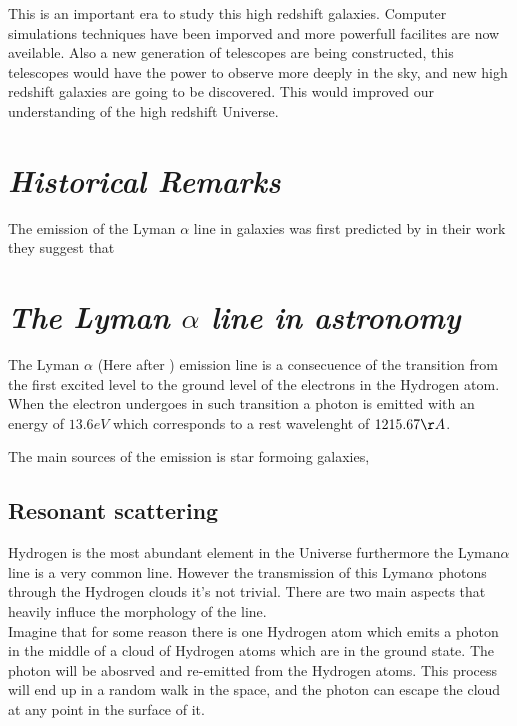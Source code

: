 This is an important era to study this high redshift galaxies. Computer 
simulations techniques have been imporved and more powerfull facilites are
now aveilable. Also a new generation of telescopes are being constructed,
this telescopes would have the power to observe more deeply in the sky, 
and new high redshift galaxies are going to be discovered. This would 
improved our understanding of the high redshift Universe. 

\section{\emph{Historical Remarks}}

The emission of the Lyman $\alpha$ line in galaxies was first predicted by \citep{PartridgePeebles} in their work they suggest that 




\section{\emph{The Lyman $\alpha$ line in astronomy}}

The Lyman $\alpha$ (Here after \ly) emission line is a consecuence of the transition 
from the first excited level to the ground level of the electrons
in the Hydrogen atom. When the electron undergoes in such transition 
a photon is emitted with an energy of $13.6eV$ which corresponds to 
a rest wavelenght of $1215.67 \AA$. 

The main sources of the \lya emission is star formoing galaxies, 

\subsection{Resonant scattering}

Hydrogen is the most abundant element in the Universe furthermore
the Lyman$\alpha$ line is a very common line. However the transmission of this
Lyman$\alpha$ photons through the Hydrogen clouds it's not trivial. There 
are two main aspects that heavily influce the morphology of the line.\\

Imagine that for some reason there is one Hydrogen atom which emits 
a \ly photon in the middle of a cloud of Hydrogen atoms which are in the
ground state. The \ly photon will be abosrved and re-emitted from 
the Hydrogen atoms. This process will end up in a random walk in the space,
and the photon can escape the cloud at any point in the surface of it.\\

